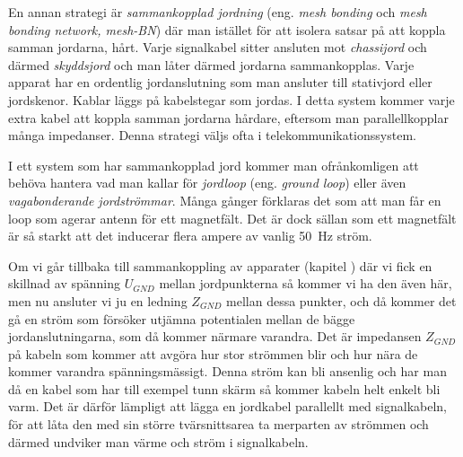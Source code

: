 En annan strategi är \emph{sammankopplad jordning} (eng. \emph{mesh bonding}
och \emph{mesh bonding network, mesh-BN}) \cite[kap 3.2.3]{K27-1991}
där man istället för att isolera satsar på att koppla samman jordarna, hårt.
Varje signalkabel sitter ansluten mot \emph{chassijord} och därmed
\emph{skyddsjord} och man låter därmed jordarna sammankopplas.
Varje apparat har en ordentlig jordanslutning som man ansluter till stativjord
eller jordskenor.
Kablar läggs på kabelstegar som jordas.
I detta system kommer varje extra kabel att koppla samman jordarna hårdare,
eftersom man parallellkopplar många impedanser.
Denna strategi väljs ofta i telekommunikationssystem.


\noindent
I ett system som har sammankopplad jord kommer man ofrånkomligen att behöva
hantera vad man kallar för \emph{jordloop} (eng. \emph{ground loop}) eller även
\emph{vagabonderande jordströmmar}.
Många gånger förklaras det som att man får en loop som agerar antenn för ett
magnetfält.
Det är dock sällan som ett magnetfält är så starkt att det inducerar flera
ampere av vanlig \qty{50}{\hertz} ström.

Om vi går tillbaka till sammankoppling av apparater (kapitel
) där vi fick en skillnad av spänning \(U_{GND}\)
mellan jordpunkterna så kommer vi ha den även här, men nu ansluter vi ju en
ledning \(Z_{GND}\) mellan dessa punkter, och då kommer det gå en ström som
försöker utjämna potentialen mellan de bägge jordanslutningarna, som då kommer
närmare varandra.
Det är impedansen \(Z_{GND}\) på kabeln som kommer att avgöra hur stor strömmen
blir och hur nära de kommer varandra spänningsmässigt.
Denna ström kan bli ansenlig och har man då en kabel som har till exempel tunn
skärm så kommer kabeln helt enkelt bli varm.
Det är därför lämpligt att lägga en jordkabel parallellt med signalkabeln, för
att låta den med sin större tvärsnittsarea ta merparten av strömmen och därmed
undviker man värme och ström i signalkabeln.

